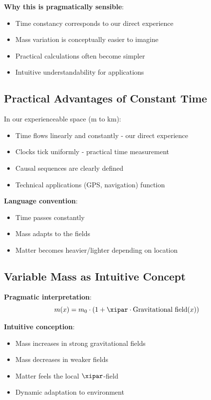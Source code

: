 	\textbf{Why this is pragmatically sensible}:
	\begin{itemize}
		\item Time constancy corresponds to our direct experience
		\item Mass variation is conceptually easier to imagine
		\item Practical calculations often become simpler
		\item Intuitive understandability for applications
	\end{itemize}
	
	\subsection{Practical Advantages of Constant Time}
	
	In our experienceable space (m to km):
	\begin{itemize}
		\item Time flows linearly and constantly - our direct experience
		\item Clocks tick uniformly - practical time measurement
		\item Causal sequences are clearly defined
		\item Technical applications (GPS, navigation) function
	\end{itemize}
	
	\textbf{Language convention}:
	\begin{itemize}
		\item Time passes constantly
		\item Mass adapts to the fields
		\item Matter becomes heavier/lighter depending on location
	\end{itemize}
	
	\subsection{Variable Mass as Intuitive Concept}
	
	\textbf{Pragmatic interpretation}:
	\begin{equation}
		m(x) = m_0 \cdot (1 + \xipar \cdot \text{Gravitational field}(x))
	\end{equation}
	
	\textbf{Intuitive conception}:
	\begin{itemize}
		\item Mass increases in strong gravitational fields
		\item Mass decreases in weaker fields
		\item Matter feels the local $\xipar$-field
		\item Dynamic adaptation to environment
	\end{itemize}
	
